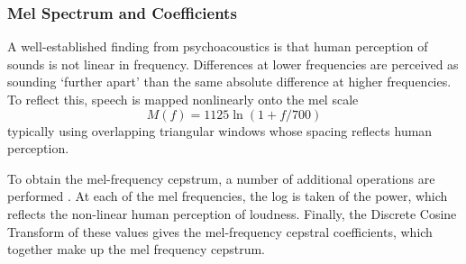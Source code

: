 \subsubsection{Mel Spectrum and Coefficients}

A well-established finding from psychoacoustics is that human perception of sounds is not linear 
in frequency. Differences at lower frequencies are perceived as sounding `further apart' 
than the same absolute difference at higher frequencies. To reflect this, speech is mapped nonlinearly 
onto the mel scale
$$M(f) = 1125 \ln (1 + f/700)$$ 
typically using overlapping triangular windows whose spacing reflects human perception. 

To obtain the mel-frequency cepstrum, a number of additional operations are performed \citep{mel2012}.
At each of the mel frequencies, the log is taken of the power, which reflects the non-linear 
human perception of loudness.
Finally, the Discrete Cosine Transform of these values gives the mel-frequency cepstral coefficients, 
which together make up the mel frequency cepstrum.

